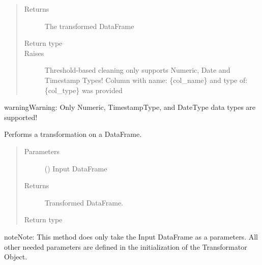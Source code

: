 \documentclass[a4paper,10pt, twoside,english]{sphinxmanual}
\begin{document}
\begin{fulllineitems}
\begin{quote}
\begin{description}
\item[{Returns}] \leavevmode
The transformed DataFrame

\item[{Return type}] \leavevmode
{}

\item[{Raises}] \leavevmode
{} \textendash{} Threshold-based cleaning only supports Numeric, Date and Timestamp Types!
Column with name: \{col\_name\} and type of: \{col\_type\} was provided

\end{description}\end{quote}

\begin{sphinxadmonition}{warning}{Warning:}
Only Numeric, TimestampType, and DateType data types are supported!
\end{sphinxadmonition}

\begin{fulllineitems}
\label{\detokenize{transformer/threshold_cleaner:spooq2.transformer.threshold_cleaner.ThresholdCleaner.transform}}
Performs a transformation on a DataFrame.
\begin{quote}\begin{description}
\item[{Parameters}] \leavevmode
{} () \textendash{} Input DataFrame

\item[{Returns}] \leavevmode
Transformed DataFrame.

\item[{Return type}] \leavevmode
{}

\end{description}\end{quote}

\begin{sphinxadmonition}{note}{Note:}
This method does only take the Input DataFrame as a parameters. All other needed parameters
are defined in the initialization of the Transformator Object.
\end{sphinxadmonition}

\end{fulllineitems}


\end{fulllineitems}
\end{document}
